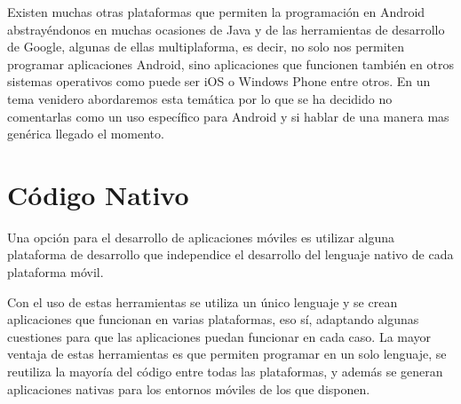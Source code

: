 \documentclass[
10pt, %
a4paper, %
oneside, %
headinclude,footinclude, %
BCOR5mm, %
]{scrartcl}
\begin{document}
Existen muchas otras plataformas que permiten la programación en Android abstrayéndonos en muchas ocasiones de Java y de las herramientas de desarrollo de Google, algunas de ellas multiplaforma, es decir, no solo nos permiten programar aplicaciones Android, sino aplicaciones que funcionen también en otros sistemas operativos como puede ser iOS o Windows Phone entre otros. En un tema venidero abordaremos esta temática por lo que se ha decidido no comentarlas como un uso específico para Android y si hablar de una manera mas genérica llegado el momento.


\section{Código Nativo}
Una opción para el desarrollo de aplicaciones móviles es utilizar alguna plataforma de desarrollo que independice el desarrollo del lenguaje nativo de cada plataforma móvil.

Con el uso de estas herramientas se utiliza un único lenguaje y se crean aplicaciones que funcionan en varias plataformas, eso sí, adaptando algunas cuestiones para que las aplicaciones puedan funcionar en cada caso. La mayor ventaja de estas herramientas es que permiten programar en un solo lenguaje, se reutiliza la mayoría del código entre todas las plataformas, y además se generan aplicaciones nativas para los entornos móviles de los que disponen.
\end{document}
